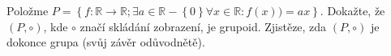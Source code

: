 \subsubsection{}
Položme $P=\left \{f:\mathbb{R}\rightarrow \mathbb{R}; \exists a
\in\mathbb{R}-\left \{ 0 \right \} \forall x \in \mathbb{R} : f(x)) = ax\right
\}$. Dokažte, že $(P,\circ)$, kde $\circ$ značí skládání zobrazení, je grupoid.
Zjistěze, zda $(P,\circ)$ je dokonce grupa (svůj závěr odůvodnětě).
